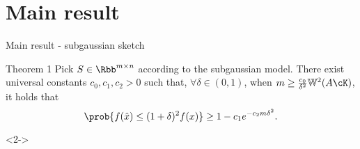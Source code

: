 \documentclass[11pt]{beamer}
\begin{document}
\section{Main result}
\begin{frame}{Main result - subgaussian sketch}
    \begin{block}{Theorem 1}
        Pick $S \in \Rbb^{m \times n}$ according to the subgaussian model.
        There exist universal constants $c_0, c_1,
        c_2 > 0$ such that, $\forall \delta \in (0, 1)$, when
        \(
            m \geq \frac{c_0}{\delta^2} \mathbb{W}^2(A \cK) \), it holds that
        \[
            \prob{f(\hat{x}) \leq (1 + \delta)^2 f(x)}
            \geq 1 - c_1 e^{-c_2 m \delta^2}.
        \]
    \end{block}
    <2->
\end{frame}
\end{document}
